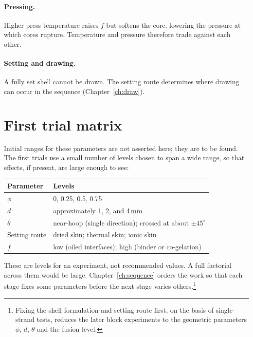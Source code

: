 \documentclass[11pt,openany]{book}
\theoremstyle{definition}
\begin{document}
\paragraph{Pressing.} Higher press temperature raises $f$ but softens the core, lowering the pressure at which cores rupture. Temperature and pressure therefore trade against each other.

\paragraph{Setting and drawing.} A fully set shell cannot be drawn. The setting route determines where drawing can occur in the sequence (Chapter~\ref{ch:draw}).

\section{First trial matrix}

Initial ranges for these parameters are not asserted here; they are to be found. The first trials use a small number of levels chosen to span a wide range, so that effects, if present, are large enough to see:

\begin{center}
\begin{tabular}{@{}ll@{}}
\toprule
Parameter & Levels \\
\midrule
$\phi$ & 0, 0.25, 0.5, 0.75 \\
$d$ & approximately 1, 2, and 4\,mm \\
$\theta$ & near-hoop (single direction); crossed at about $\pm45^\circ$ \\
Setting route & dried skin; thermal skin; ionic skin \\
$f$ & low (oiled interfaces); high (binder or co-gelation) \\
\bottomrule
\end{tabular}
\end{center}

These are levels for an experiment, not recommended values. A full factorial across them would be large. Chapter~\ref{ch:sequence} orders the work so that each stage fixes some parameters before the next stage varies others.\footnote{Fixing the shell formulation and setting route first, on the basis of single-strand tests, reduces the later block experiments to the geometric parameters $\phi$, $d$, $\theta$ and the fusion level.}

\end{document}
